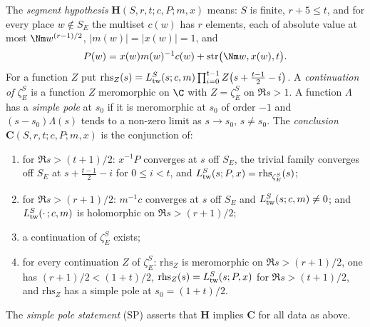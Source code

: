 \begin{definition}\label{pf:liftinj:SPdef}
The \emph{segment hypothesis} $\mathbf H(S,r,t;c,P;m,x)$ means: $S$ is finite, $r+5\le t$, and for every place $w\notin S_E$ the multiset
$c(w)$ has $r$ elements, each of absolute value at most $\Nm w^{(r-1)/2}$, $|m(w)|=|x(w)|=1$, and
\begin{equation}\label{eq:pf:liftinj:liftfam}
P(w)=x(w)m(w)^{-1}c(w)+\liftinjstr\bigl(\Nm w,x(w),t\bigr).
\end{equation}
For a function $Z$ put $\mathrm{rhs}_Z(s)=L^{S}_{\mathrm{tw}}(s;c,m)\prod_{i=0}^{t-1}Z\bigl(s+\tfrac{t-1}2-i\bigr)$. A
\emph{continuation of $\zeta^S_E$} is a function $Z$ meromorphic on $\C$ with $Z=\zeta^S_E$ on $\Re s>1$. A function
$\Lambda$ has a \emph{simple pole} at $s_0$ if it is meromorphic at $s_0$ of order $-1$ and $(s-s_0)\Lambda(s)$
tends to a non-zero limit as $s\to s_0$, $s\ne s_0$. The \emph{conclusion} $\mathbf C(S,r,t;c,P;m,x)$ is the conjunction of:
\begin{enumerate}[label=(\roman*)]
\item for $\Re s>(t+1)/2$: $x^{-1}P$ converges at $s$ off $S_E$, the trivial family converges off $S_E$ at
$s+\frac{t-1}2-i$ for $0\le i<t$, and $L^{S}_{\mathrm{tw}}(s;P,x)=\mathrm{rhs}_{\zeta^S_E}(s)$;
\item for $\Re s>(r+1)/2$: $m^{-1}c$ converges at $s$ off $S_E$ and $L^{S}_{\mathrm{tw}}(s;c,m)\ne0$; and
$L^{S}_{\mathrm{tw}}(\cdot\,;c,m)$ is holomorphic on $\Re s>(r+1)/2$;
\item a continuation of $\zeta^S_E$ exists;
\item for every continuation $Z$ of $\zeta^S_E$: $\mathrm{rhs}_Z$ is meromorphic on $\Re s>(r+1)/2$, one has
$(r+1)/2<(1+t)/2$, $\mathrm{rhs}_Z(s)=L^{S}_{\mathrm{tw}}(s;P,x)$ for $\Re s>(t+1)/2$, and $\mathrm{rhs}_Z$ has a simple
pole at $s_0=(1+t)/2$.
\end{enumerate}
The \emph{simple pole statement} (SP) asserts that $\mathbf H$ implies $\mathbf C$ for all data as above.
\end{definition}


